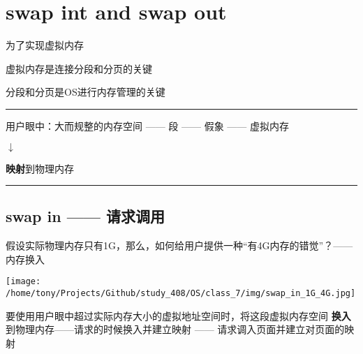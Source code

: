 \documentclass[a4paper, oneside, 11pt, utf8]{article}
\author{}
\date{}
\begin{document}
\hypertarget{swap-int-and-swap-out}{%
\section{\texorpdfstring{swap int and swap out
}{swap int and swap out }}\label{swap-int-and-swap-out}}

为了实现虚拟内存

虚拟内存是连接分段和分页的关键

分段和分页是OS进行内存管理的关键

\begin{center}\rule{0.5\linewidth}{0.5pt}\end{center}

用户眼中：大而规整的内存空间 ------ 段 ------ 假象 ------ 虚拟内存

\(\downarrow\)

\textbf{映射}到物理内存

\begin{center}\rule{0.5\linewidth}{0.5pt}\end{center}

\subsection{swap in ------ 请求调用}\label{swap-in--------ux8bf7ux6c42ux8c03ux7528}

假设实际物理内存只有1G，那么，如何给用户提供一种``有4G内存的错觉''？------
内存换入

\texttt{[image: /home/tony/Projects/Github/study\_408/OS/class\_7/img/swap\_in\_1G\_4G.jpg]}

要使用用户眼中超过实际内存大小的虚拟地址空间时，将这段虚拟内存空间
\textbf{换入} 到物理内存------请求的时候换入并建立映射 ------
请求调入页面并建立对页面的映射
\end{document}
